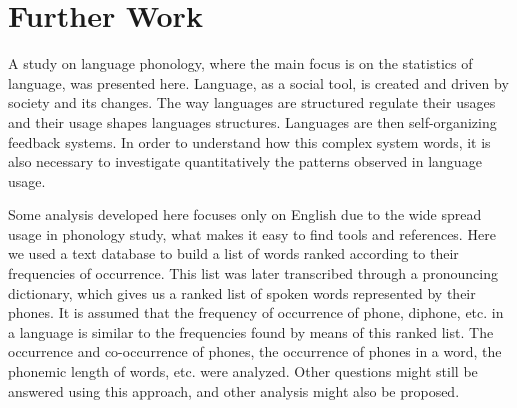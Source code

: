 \chapter{Further Work}

A study on language phonology, where the main focus is on the statistics of language, was presented here. 
Language, as a social tool, is created and driven by society and its changes. 
The way languages are structured regulate their usages and their usage shapes languages structures. 
Languages are then self-organizing feedback systems.
In order to understand how this complex system words, it is also necessary to investigate quantitatively 
the patterns observed in language usage.

Some analysis developed here focuses only on English due to the wide spread usage in phonology study, 
what makes it easy to find tools and references. Here we used a text database to build a list of words 
ranked according to their frequencies of occurrence. This list was later transcribed through 
a pronouncing dictionary, which gives us a ranked list of spoken words represented by their phones. 
It is assumed that the frequency of occurrence of phone, diphone, etc. in a language is similar to 
the frequencies found by means of this ranked list. The occurrence and co-occurrence of phones, 
the occurrence of phones in a word, the phonemic length of words, etc. were analyzed. 
Other questions might still be answered using this approach, and other analysis might also be proposed.

